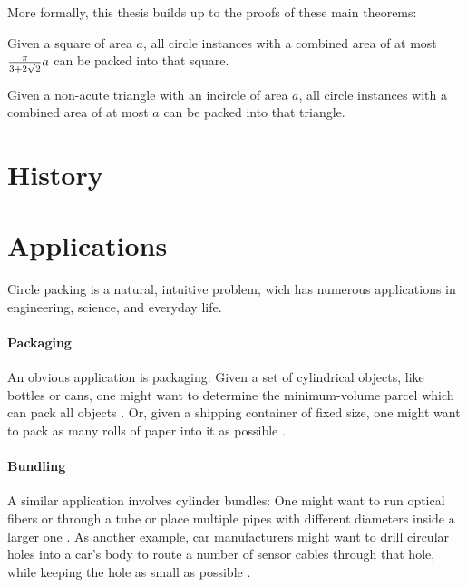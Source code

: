 More formally, this thesis builds up to the proofs of these main theorems:

\begin{theorem}
    Given a square of area $a$, all circle instances with a combined area of at most $\frac{\pi}{3+2\sqrt{2}} a$ can be packed into that square.
\end{theorem}

\begin{theorem}
    Given a non-acute triangle with an incircle of area $a$, all circle instances with a combined area of at most $a$ can be packed into that triangle.
\end{theorem}

\section{History}

\section{Applications}

Circle packing is a natural, intuitive problem, wich has numerous applications in engineering, science, and everyday life.

\paragraph{Packaging}

An obvious application is packaging: Given a set of cylindrical objects, like bottles or cans, one might want to determine the minimum-volume parcel which can pack all objects \parencite{CKP2008solving}. Or, given a shipping container of fixed size, one might want to pack as many rolls of paper into it as possible \parencite{fraser1994integrated}.

\paragraph{Bundling}

A similar application involves cylinder bundles:
One might want to run optical fibers or through a tube or place multiple pipes with different diameters inside a larger one \parencite{WHZX2002improved}. As another example, car manufacturers might want to drill circular holes into a car's body to route a number of sensor cables through that hole, while keeping the hole as small as possible \cite{SSSKK2004disk}.

